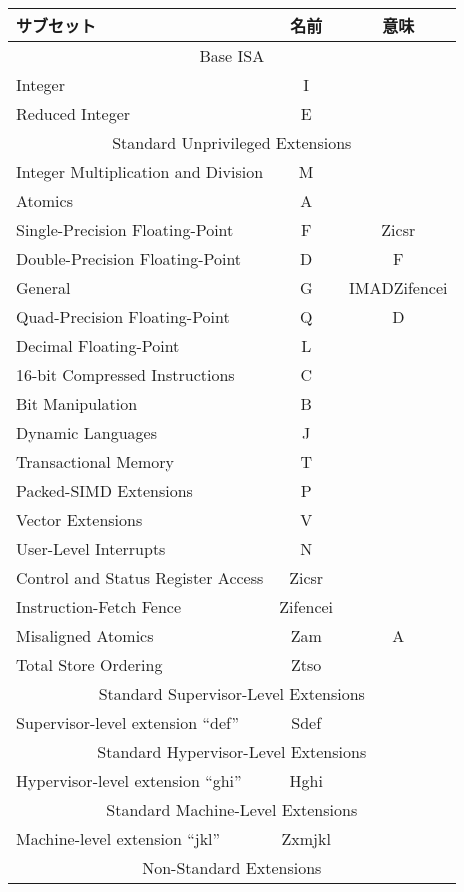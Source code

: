 \begin{table}[h]
\center
\begin{tabular}{|l|c|c|}
\hline
サブセット & 名前 & 意味 \\
\hline
\hline
\multicolumn{3}{|c|}{Base ISA}\\
\hline
Integer & I & \\
Reduced Integer & E & \\
\hline
\hline
\multicolumn{3}{|c|}{Standard Unprivileged Extensions}\\
\hline
Integer Multiplication and Division & M & \\
Atomics & A & \\
Single-Precision Floating-Point & F & Zicsr \\
Double-Precision Floating-Point & D & F \\
\hline
General & G & IMADZifencei \\
\hline
Quad-Precision Floating-Point & Q & D\\
Decimal Floating-Point & L & \\
16-bit Compressed Instructions & C & \\
Bit Manipulation & B & \\
Dynamic Languages & J & \\
Transactional Memory & T & \\
Packed-SIMD Extensions & P & \\
Vector Extensions & V & \\
User-Level Interrupts & N & \\
Control and Status Register Access & Zicsr & \\
Instruction-Fetch Fence & Zifencei & \\
Misaligned Atomics & Zam & A \\
Total Store Ordering & Ztso & \\
\hline
\hline
\multicolumn{3}{|c|}{Standard Supervisor-Level Extensions}\\
\hline
Supervisor-level extension ``def'' & Sdef & \\
\hline
\hline
\multicolumn{3}{|c|}{Standard Hypervisor-Level Extensions}\\
\hline
Hypervisor-level extension ``ghi'' & Hghi & \\
\hline
\hline
\multicolumn{3}{|c|}{Standard Machine-Level Extensions}\\
\hline
Machine-level extension ``jkl'' & Zxmjkl & \\
\hline
\hline
\multicolumn{3}{|c|}{Non-Standard Extensions}\\

\end{tabular}
\end{table}
